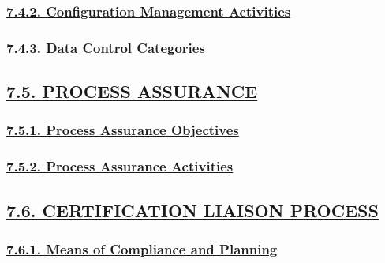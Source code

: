 \documentclass[
]{article}
\begin{document}
\hypertarget{configuration-management-activities}{%
\subsubsection{\texorpdfstring{\protect\hyperlink{configuration-management-activities-1}{7.4.2.
Configuration Management
Activities}}{7.4.2. Configuration Management Activities}}\label{configuration-management-activities}}

\hypertarget{data-control-categories}{%
\subsubsection{\texorpdfstring{\protect\hyperlink{data-control-categories-1}{7.4.3.
Data Control
Categories}}{7.4.3. Data Control Categories}}\label{data-control-categories}}

\hypertarget{process-assurance}{%
\subsection{\texorpdfstring{\protect\hyperlink{process-assurance-1}{7.5.
PROCESS ASSURANCE}}{7.5. PROCESS ASSURANCE}}\label{process-assurance}}

\hypertarget{process-assurance-objectives}{%
\subsubsection{\texorpdfstring{\protect\hyperlink{process-assurance-objectives-1}{7.5.1.
Process Assurance
Objectives}}{7.5.1. Process Assurance Objectives}}\label{process-assurance-objectives}}

\hypertarget{process-assurance-activities}{%
\subsubsection{\texorpdfstring{\protect\hyperlink{process-assurance-activities-1}{7.5.2.
Process Assurance
Activities}}{7.5.2. Process Assurance Activities}}\label{process-assurance-activities}}

\hypertarget{certification-liaison-process}{%
\subsection{\texorpdfstring{\protect\hyperlink{certification-liaison-process-1}{7.6.
CERTIFICATION LIAISON
PROCESS}}{7.6. CERTIFICATION LIAISON PROCESS}}\label{certification-liaison-process}}

\hypertarget{means-of-compliance-and-planning}{%
\subsubsection{\texorpdfstring{\protect\hyperlink{means-of-compliance-and-planning-1}{7.6.1.
Means of Compliance and
Planning}}{7.6.1. Means of Compliance and Planning}}\label{means-of-compliance-and-planning}}
\end{document}
